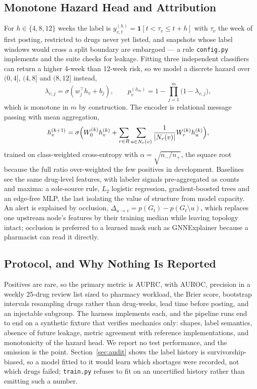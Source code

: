 \documentclass[conference,letterpaper]{IEEEtran}
\begin{document}
\subsection{Monotone Hazard Head and Attribution}
For $h\in\{4,8,12\}$ weeks the label is
$y^{(h)}_{v,t}=\mathbf{1}[t<\tau_v\le t+h]$ with $\tau_v$ the week of first
posting, restricted to drugs never yet listed, and snapshots whose label
windows would cross a split boundary are embargoed --- a rule
\texttt{config.py} implements and the suite checks for leakage. Fitting three
independent classifiers can return a higher 4-week than 12-week risk, so we
model a discrete hazard over $(0,4]$, $(4,8]$ and $(8,12]$ instead,
\begin{equation}
\lambda_{v,j}=\sigma(w_j^\top h_v+b_j),\qquad
p^{(h_m)}_{v}=1-\prod_{j=1}^{m}\bigl(1-\lambda_{v,j}\bigr),
\end{equation}
which is monotone in $m$ by construction. The encoder is relational message
passing with mean aggregation\cite{rgcn,graphsage},
\begin{equation}
 h_v^{(k+1)}=\sigma\Bigl(W_0^{(k)}h_v^{(k)}
 +\sum_{r\in R}\sum_{u\in N_r(v)}\frac{1}{|N_r(v)|}W_r^{(k)}h_u^{(k)}\Bigr),
\end{equation}
trained on class-weighted cross-entropy with $\alpha=\sqrt{n_-/n_+}$, the square
root because the full ratio over-weighted the few positives in development. Baselines see the same drug-level features, with
labeler signals pre-aggregated as counts and maxima: a sole-source rule,
$L_2$ logistic regression, gradient-boosted trees\cite{xgboost} and an
edge-free MLP, the last isolating the value of structure from model capacity.
An alert is explained by occlusion,
$\Delta_{u\to v}=p(G_t)-p(G_t\setminus u)$, which replaces one upstream node's
features by their training median while leaving topology intact; occlusion is
preferred to a learned mask such as GNNExplainer\cite{gnnexplainer} because a
pharmacist can read it directly.

\subsection{Protocol, and Why Nothing Is Reported}\label{sec:status}
Positives are rare, so the primary metric is AUPRC\cite{saito}, with AUROC,
precision in a weekly 25-drug review list sized to pharmacy workload, the Brier
score, bootstrap intervals resampling drugs rather than drug-weeks, lead time
before posting, and an injectable subgroup. The harness implements each, and the
pipeline runs end to end on a synthetic fixture that verifies mechanics only:
shapes, label semantics, absence of future leakage, metric agreement with
reference implementations, and monotonicity of the hazard head. We report no test
performance, and the omission is the point.
Section~\ref{sec:audit} shows the label history is survivorship-biased, so a
model fitted to it would learn which shortages were recorded, not which drugs
failed; \texttt{train.py} refuses to fit on an uncertified history rather than
emitting such a number. 
\end{document}
